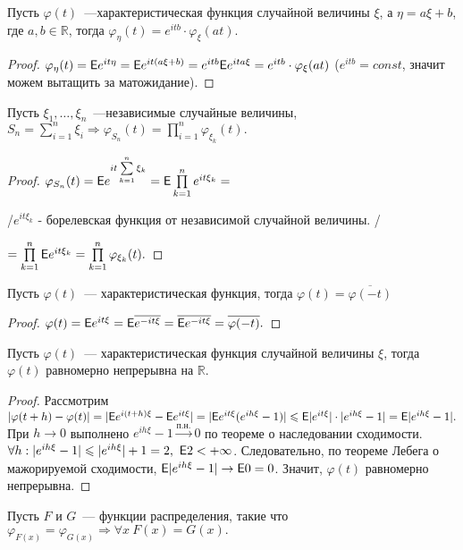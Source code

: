  \begin{property}
		Пусть $\varphi(t)$~---характеристическая функция случайной величины $\xi$, а $\eta = a\xi + b$, где $a, b \in \mathbb{R}$, тогда $\varphi_\eta(t) = e^{itb}\cdot \varphi_\xi(at).$
		\begin{proof}
			$\varphi_\eta(t) = \mathsf{E} e^{it\eta} = \mathsf{E} e^{it(a\xi + b)} = e^{itb} \mathsf{E} e^{ita\xi} = e^{itb}\cdot \varphi_\xi(at)$ ($e^{itb} = const$, значит можем вытащить за матожидание).
		\end{proof}
	\end{property}

	\begin{property}
		Пусть $\xi_1, \ldots, \xi_n$~---независимые случайные величины, $S_n = \sum\limits_{i = 1}^{n}\xi_i \Rightarrow \varphi_{S_n}(t) = \prod\limits_{i = 1}^n\varphi_{\xi_k}(t).$  
		\begin{proof}
			$\varphi_{S_n}(t) = \mathsf{E} e^{it \sum\limits_{k = 1}^{n}\xi_k} = \mathsf{E}\prod\limits_{k = 1}^n e^{it\xi_k} =$ 
			
			/$e^{it\xi_k}$ - борелевская функция от независимой случайной величины. / 
			
			$= \prod\limits_{k = 1}^{n}\mathsf{E} e^{it\xi_k} = \prod\limits_{k = 1}^{n}\varphi_{\xi_k}(t).$
		\end{proof}
	\end{property}
	\begin{property}
		Пусть $\varphi(t)$~--- характеристическая функция, тогда $\varphi(t) = \overline{\varphi(-t)}$
		\begin{proof}
			$\varphi(t) = \mathsf{E} e^{it\xi} = \mathsf{E}\overline{e^{-it\xi}} = \overline{\mathsf{E} e^{-it\xi}} = \overline{\varphi(-t)}.$
		\end{proof}
	\end{property}
	\begin{property}
		Пусть $\varphi(t)$~--- характеристическая функция случайной величины $\xi$, тогда $\varphi(t)$ равномерно непрерывна на $\mathbb{R}.$
		\begin{proof}
			Рассмотрим $|\varphi(t + h) - \varphi(t)| = |\mathsf{E} e^{i(t+h)\xi} - \mathsf{E} e^{it\xi}| = |\mathsf{E} e^{it\xi}(e^{ih\xi} - 1)| \leqslant \mathsf{E} |e^{it\xi}|\cdot |e^{ih\xi} - 1| = \mathsf{E} |e^{ih\xi} - 1|.$
			При $h \to 0$ выполнено $e^{ih\xi} - 1 \overset{\text{п.н.}} \longrightarrow 0 $ по теореме о наследовании сходимости. $\forall h: |e^{ih\xi} - 1| \leqslant |e^{ih\xi}| + 1 = 2, ~ \mathsf{E} 2 < +\infty$. Следовательно, по теореме Лебега о мажорируемой сходимости, $\mathsf{E} |e^{ih\xi} - 1| \to \mathsf{E} 0 = 0$. Значит, $\varphi(t)$ равномерно непрерывна.
		\end{proof}
	\end{property}
		\begin{theorem}
		Пусть $F$ и $G$~--- функции распределения, такие что $\varphi_{F(x)} = \varphi_{G(x)} \Rightarrow \forall x\  F(x) = G(x).$
	\end{theorem}
	

